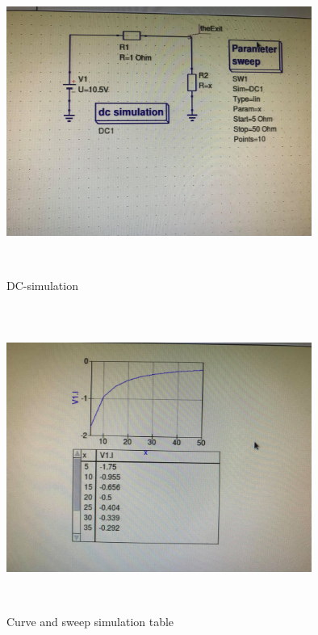 \documentclass{report}
\begin{document}
\begin{figure}[!tb]
\begin{center}

\includegraphics[width=10cm,height=10cm,keepaspectratio]{dc-simulation.jpg}


\caption{DC-simulation}
\label{fig:figure 2}
\end{center}
\end{figure}

\begin{figure}[!tb]
\begin{center}

\includegraphics[width=10cm,height=10cm,keepaspectratio]{after-sim.jpg}
\caption{Curve and sweep simulation table}
\label{fig:figure 3}
\end{center}
\end{figure}
\end{document}
